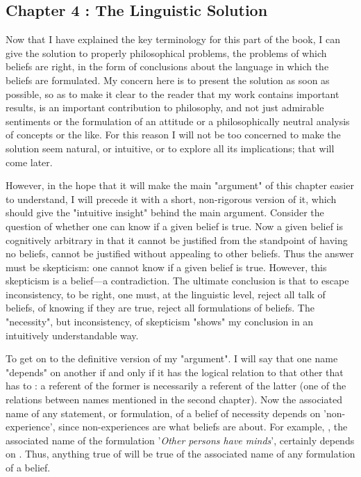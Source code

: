 \documentclass[10pt,twoside]{memoir}
\newcommand{\formulation}[1]{'\textit{#1}'}
\begin{document}
\begin{enumerate}
{\subsection*{Chapter 4 : The Linguistic Solution}

Now that I have explained the key terminology for this part of the 
book, I can give the solution to properly philosophical problems, the 
problems of which beliefs are right, in the form of conclusions about the 
language in which the beliefs are formulated. My concern here is to present 
the solution as soon as possible, so as to make it clear to the reader that my 
work contains important results, is an important contribution to philosophy, 
and not just admirable sentiments or the formulation of an attitude or a 
philosophically neutral analysis of concepts or the like. For this reason I will 
not be too concerned to make the solution seem natural, or intuitive, or to 
explore all its implications; that will come later. 

However, in the hope that it will make the main "argument" of this 
chapter easier to understand, I will precede it with a short, non-rigorous 
version of it, which should give the "intuitive insight" behind the main 
argument. Consider the question of whether one can know if a given belief is 
true. Now a given belief is cognitively arbitrary in that it cannot be justified 
from the standpoint of having no beliefs, cannot be justified without 
appealing to other beliefs. Thus the answer must be skepticism: one cannot 
know if a given belief is true. However, this skepticism is a belief---a 
contradiction. The ultimate conclusion is that to escape inconsistency, to be 
right, one must, at the linguistic level, reject all talk of beliefs, of knowing if 
they are true, reject all formulations of beliefs. The "necessity", but 
inconsistency, of skepticism "shows" my conclusion in an intuitively 
understandable way. 

To get on to the definitive version of my "argument". I will say that 
one name "depends" on another if and only if it has the logical relation to 
that other that  has to : a referent of the former is 
necessarily a referent of the latter (one of the relations between names 
mentioned in the second chapter). Now the associated name of any 
statement, or formulation, of a belief of necessity depends on 
'non-experience', since non-experiences are what beliefs are about. For 
example, , the associated name of the 
formulation \formulation{Other persons have minds}, certainly depends on 
. Thus, anything true of  will be true of the 
associated name of any formulation of a belief. 

}
\end{enumerate}
\end{document}
